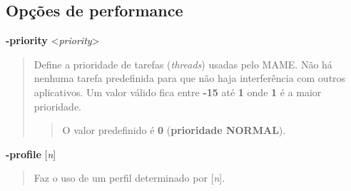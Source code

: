 \documentclass[letterpaper,10pt,brazil]{sphinxmanual}
\begin{document}
\subsection{Opções de performance}
\label{commandline/windowsconfig:opcoes-de-performance}\label{commandline/windowsconfig:mame-wcommandline-priority}
\textbf{-priority} \textless{}\emph{priority}\textgreater{}
\begin{quote}

Define a prioridade de tarefas (\emph{threads}) usadas pelo MAME. Não há
nenhuma tarefa predefinida para que não haja interferência com
outros aplicativos.
Um valor válido fica entre \textbf{-15} até \textbf{1} onde \textbf{1} é a maior
prioridade.
\begin{quote}

O valor predefinido é \textbf{0} (\textbf{prioridade NORMAL}).
\end{quote}
\end{quote}
\label{commandline/windowsconfig:mame-wcommandline-profile}
\textbf{-profile} {[}\emph{n}{]}
\begin{quote}

Faz o uso de um perfil determinado por {[}\emph{n}{]}.
\end{quote}
\end{document}
